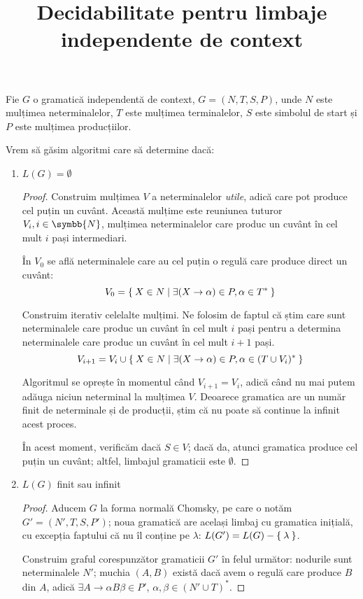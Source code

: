 \documentclass{article}
\title{Decidabilitate pentru limbaje independente de context}
\author{}
\date{}
\newcommand{\naturals}{\symbb{N}}
\begin{document}
\maketitle

Fie \(G\) o gramatică independentă de context, \(G = (N, T, S, P)\), unde \(N\) este mulțimea neterminalelor, \(T\) este mulțimea terminalelor, \(S\) este simbolul de start și \(P\) este mulțimea producțiilor.

Vrem să găsim algoritmi care să determine dacă:

\begin{enumerate}
    \item \(L(G) = \emptyset\)
    \begin{proof}
    Construim mulțimea \(V\) a neterminalelor \emph{utile}, adică care pot produce cel puțin un cuvânt. Această mulțime este reuniunea tuturor \(V_i, i \in \naturals\), mulțimea neterminalelor care produc un cuvânt în cel mult \(i\) pași intermediari.
    
    În \(V_0\) se află neterminalele care au cel puțin o regulă care produce direct un cuvânt:
    \[
        V_0 = \Set{ X \in N | \exists (X \to \alpha) \in P, \alpha \in T^* }
    \]
    
    Construim iterativ celelalte mulțimi. Ne folosim de faptul că știm care sunt neterminalele care produc un cuvânt în cel mult \(i\) pași pentru a determina neterminalele care produc un cuvânt în cel mult \(i + 1\) pași.
    \[
        V_{i + 1} = V_i \cup \Set{ X \in N | \exists (X \to \alpha) \in P, \alpha \in (T \cup V_i)^* }
    \]
    
    Algoritmul se oprește în momentul când \(V_{i + 1} = V_i\), adică când nu mai putem adăuga niciun neterminal la mulțimea \(V\). Deoarece gramatica are un număr finit de neterminale și de producții, știm că nu poate să continue la infinit acest proces. 
    
    În acest moment, verificăm dacă \(S \in V\); dacă da, atunci gramatica produce cel puțin un cuvânt; altfel, limbajul gramaticii este \(\emptyset\).
    \end{proof}
    \item \(L(G)\) finit sau infinit
    \begin{proof}
    Aducem \(G\) la forma normală Chomsky, pe care o notăm \(G' = (N', T, S, P')\); noua gramatică are același limbaj cu gramatica inițială, cu excepția faptului că nu îl conține pe \(\lambda\): \(L(G') = L(G) - \Set{\lambda}\).
    
    Construim graful corespunzător gramaticii \(G'\) în felul următor: nodurile sunt neterminalele \(N'\); muchia \((A, B)\) există dacă avem o regulă care produce \(B\) din \(A\), adică \(\exists A \to \alpha B \beta \in P'\), \(\alpha, \beta \in (N' \cup T)^*\).
    

\end{proof}
\end{enumerate}
\end{document}
